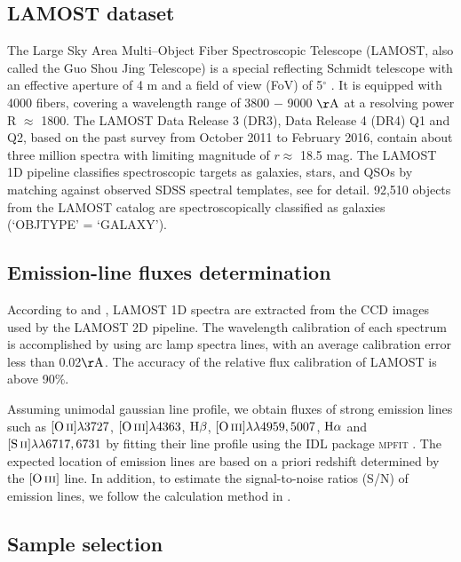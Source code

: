 \documentclass[usenatbib]{raa}
\begin{document}
\subsection{LAMOST dataset}
\label{sect:2.1}
The Large Sky Area Multi--Object Fiber Spectroscopic Telescope (LAMOST, also called the 
Guo Shou Jing Telescope) is a special reflecting Schmidt telescope with an effective 
aperture of 4 m and a field of view (FoV) of 5$^{\circ}$ \citep{Wang:96, 1009-9271-4-1-1, 2012RAA....12..723Z, 2012RAA....12.1197C, 1674-4527-12-9-004}. It is equipped with 4000 fibers, 
covering a wavelength range of 3800 $-$ 9000 $\mathrm{\AA}$ \citep{2015RAA....15.1095L} at a resolving power R $\approx$ 1800. The LAMOST Data Release 3 (DR3), Data Release 4 (DR4)  Q1 and  Q2, based
on the past survey from October 2011 to  February 2016, contain about  three million spectra with limiting magnitude of $r \approx$ 18.5 mag. The LAMOST 1D pipeline classifies spectroscopic targets as galaxies,
 stars, and QSOs by matching against observed SDSS spectral templates, see 
\cite{2015RAA....15.1095L} for detail. 92,510 objects from the LAMOST catalog are spectroscopically classified as galaxies (`OBJTYPE' = `GALAXY').

\subsection{Emission-line fluxes determination}
\label{sect:2. 2}

According to \cite{2012RAA....12..453S} and \cite{2015RAA....15.1095L}, LAMOST
1D spectra are extracted from the CCD images used by the LAMOST 2D pipeline. The
wavelength calibration of each spectrum is accomplished by using arc lamp spectra
lines, with an average calibration error less than 0.02$\rm \AA$.  The accuracy 
of the relative flux calibration
of LAMOST is above 90$\%$.

Assuming unimodal gaussian line profile, we obtain fluxes of strong 
emission lines
such as $\hbox{[O\,{\sc ii}]}\lambda3727$, $\hbox{[O\,{\sc iii}]}\lambda4363$,  $\hbox{H$\beta$}$,  $\hbox{[O\,{\sc iii}]}\lambda\lambda4959,5007$, $\hbox{H$\alpha$}$
and $\hbox{[S\,{\sc ii}]}\lambda\lambda6717,6731$ by fitting their line profile using the 
IDL package \textsc{mpfit} \citep{2009ATel.2258....1M}. The expected location 
of emission lines are based on a priori redshift determined by  the $\hbox{[O\,{\sc iii}]}$ line. 
In addition, to estimate the signal-to-noise ratios (S/N) of emission lines, 
we follow the 
calculation
method in \cite{2014ApJ...780..122L}.

\subsection{Sample selection}
\label{sect:2.3}
\end{document}
